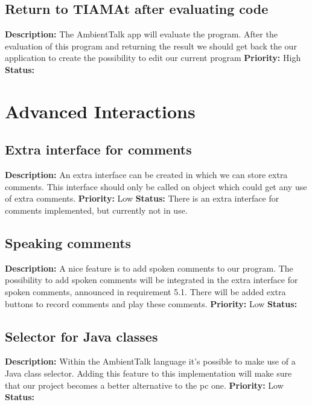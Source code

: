 \documentclass[a4paper,12pt]{report}
\begin{document}
\subsection{Return to TIAMAt after evaluating code}
\textbf{Description: } The AmbientTalk app will evaluate the program. After the evaluation of this program and returning the result we should get back the our application to
create the possibility to edit our current program\newline
\textbf{Priority:} High \newline
\textbf{Status: } \newline
\section{Advanced Interactions}
\subsection{Extra interface for comments}
\textbf{Description: } An extra interface can be created in which we can store extra comments. This interface should only be called on object which could get any use of extra comments.
 \newline
\textbf{Priority:} Low \newline
\textbf{Status: } There is an extra interface for comments implemented, but currently not in use.\newline
\subsection{Speaking comments}
\textbf{Description: } A nice feature is to add spoken comments to our program. The possibility to add spoken comments will be integrated in the
extra interface for spoken comments, announced in requirement 5.1. There will be added extra buttons to record comments and play these comments.\newline
\textbf{Priority:} Low \newline
\textbf{Status: } \newline
\subsection{Selector for Java classes}
\textbf{Description: } Within the AmbientTalk language it's possible to make use of a Java class selector. Adding this feature to this implementation
will make sure that our project becomes a better alternative to the pc one.\newline
\textbf{Priority:} Low \newline
\textbf{Status: } \newline
\end{document}
